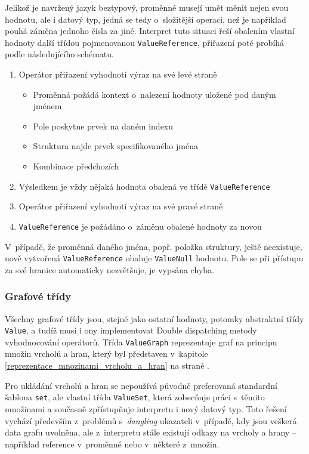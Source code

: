 \documentclass[11pt,twoside,a4paper]{book}
\begin{document}
Jelikož je navržený jazyk beztypový, proměnné musejí umět měnit nejen svou hodnotu, ale i datový typ, jedná se tedy o~složitější operaci, než je například pouhá záměna jednoho čísla za jiné. Interpret tuto situaci řeší obalením vlastní hodnoty další třídou pojmenovanou \texttt{ValueReference}, přiřazení poté probíhá podle následujícího schématu.

\begin{enumerate}
\item Operátor přiřazení vyhodnotí výraz na své levé straně
	\begin{itemize}
	\item Proměnná požádá kontext o~nalezení hodnoty uložené pod daným jménem
	\item Pole poskytne prvek na daném indexu
	\item Struktura najde prvek specifikovaného jména
	\item Kombinace předchozích
	\end{itemize}
\item Výsledkem je vždy nějaká hodnota obalená ve třídě \texttt{ValueReference}
\item Operátor přiřazení vyhodnotí výraz na své pravé straně
\item \texttt{ValueReference} je požádáno o~záměnu obalené hodnoty za novou
\end{enumerate}

V~případě, že proměnná daného jména, popř. položka struktury, ještě neexistuje, nově vytvořená \texttt{ValueReference} obaluje \texttt{ValueNull} hodnotu. Pole se při přístupu za své hranice automaticky nezvětšuje, je vypsána chyba.


\subsubsection{Grafové třídy}

Všechny grafové třídy jsou, stejně jako ostatní hodnoty, potomky abstraktní třídy \texttt{Value}, a tudíž musí i ony implementovat Double dispatching metody vyhodnocování operátorů. Třída \texttt{ValueGraph} reprezentuje graf na principu množin vrcholů a hran, který byl představen v~kapitole \ref{reprezentace_mnozinami_vrcholu_a_hran} na straně \pageref{reprezentace_mnozinami_vrcholu_a_hran}.

Pro ukládání vrcholů a hran se nepoužívá původně preferovaná standardní šablona \texttt{set}, ale vlastní třída \texttt{ValueSet}, která zobecňuje práci s~těmito množinami a současně zpřístupňuje interpretu i nový datový typ. Toto řešení vychází především z~problémů s~\textit{dangling} ukazateli v~případě, kdy jsou veškerá data grafu uvolněna, ale z~interpretu stále existují odkazy na vrcholy a hrany -- například reference v~proměnné nebo v~některé z~množin.
\end{document}
